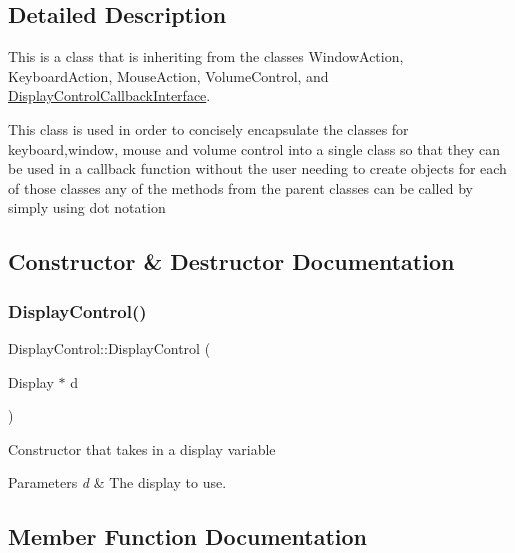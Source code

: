 \subsection{Detailed Description}
This is a class that is inheriting from the classes Window\+Action, Keyboard\+Action, Mouse\+Action, Volume\+Control, and \hyperlink{classGestro_1_1DisplayControlCallbackInterface}{Display\+Control\+Callback\+Interface}. 

This class is used in order to concisely encapsulate the classes for keyboard,window, mouse and volume control into a single class so that they can be used in a callback function without the user needing to create objects for each of those classes any of the methods from the parent classes can be called by simply using dot notation 

\subsection{Constructor \& Destructor Documentation}
\mbox{\label{classGestro_1_1DisplayControl_a4d2a5053b250bbd1f3103795cb29fcde}} 
\subsubsection{\texorpdfstring{Display\+Control()}{DisplayControl()}}
{\footnotesize\ttfamily Display\+Control\+::\+Display\+Control (\begin{DoxyParamCaption}\item[{Display $\ast$}]{d }\end{DoxyParamCaption})}

Constructor that takes in a display variable


\begin{DoxyParams}{Parameters}
{\em d} & The display to use. \\
\hline
\end{DoxyParams}


\subsection{Member Function Documentation}
\mbox{\label{classGestro_1_1DisplayControl_a5f45c36e699afa1d56b2af78e5125aca}} 
